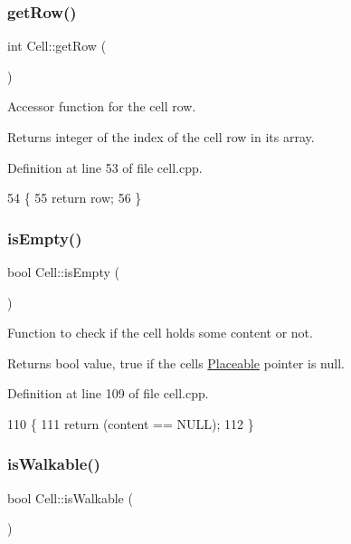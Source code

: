 \subsubsection{\texorpdfstring{get\+Row()}{getRow()}}
{\footnotesize\ttfamily int Cell\+::get\+Row (\begin{DoxyParamCaption}{ }\end{DoxyParamCaption})}

Accessor function for the cell row. \begin{DoxyReturn}{Returns}
integer of the index of the cell row in its array. 
\end{DoxyReturn}


Definition at line 53 of file cell.\+cpp.


\begin{DoxyCode}
54 \{
55     \textcolor{keywordflow}{return} row;
56 \}
\end{DoxyCode}
\hypertarget{class_cell_a6c7344ef2aa917e70364221bf86ff8bc}{}\label{class_cell_a6c7344ef2aa917e70364221bf86ff8bc} 
\subsubsection{\texorpdfstring{is\+Empty()}{isEmpty()}}
{\footnotesize\ttfamily bool Cell\+::is\+Empty (\begin{DoxyParamCaption}{ }\end{DoxyParamCaption})}

Function to check if the cell holds some content or not. \begin{DoxyReturn}{Returns}
bool value, true if the cell\textquotesingle{}s \hyperlink{class_placeable}{Placeable} pointer is null. 
\end{DoxyReturn}


Definition at line 109 of file cell.\+cpp.


\begin{DoxyCode}
110 \{
111     \textcolor{keywordflow}{return} (content == NULL);
112 \}
\end{DoxyCode}
\hypertarget{class_cell_af8625542ca100de4cc6e221ea131f05c}{}\label{class_cell_af8625542ca100de4cc6e221ea131f05c} 
\subsubsection{\texorpdfstring{is\+Walkable()}{isWalkable()}}
{\footnotesize\ttfamily bool Cell\+::is\+Walkable (\begin{DoxyParamCaption}{ }\end{DoxyParamCaption})}


